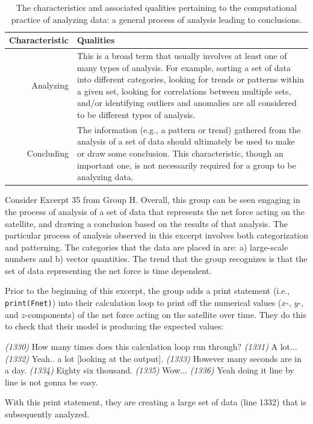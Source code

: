 \documentclass{msuphddissertation}
\begin{document}
\begin{doublespace}
\begin{table}
\begin{tabular}{r|p{}}
Characteristic & Qualities \\\hline\hline
Analyzing & This is a broad term that usually involves at least one of many types of analysis.  For example, sorting a set of data into different categories, looking for trends or patterns within a given set, looking for correlations between multiple sets, and/or identifying outliers and anomalies are all considered to be different types of analysis.\\
Concluding & The information (e.g., a pattern or trend) gathered from the analysis of a set of data should ultimately be used to make or draw some conclusion.  This characteristic, though an important one, is not necessarily required for a group to be analyzing data.\\
\end{tabular}\caption{The characteristics and associated qualities pertaining to the computational practice of analyzing data: a general process of analysis leading to conclusions.}\label{CH5:AnalyzingData}
\end{table}

Consider Excerpt 35 from Group H.  Overall, this group can be seen engaging in the process of analysis of a set of data that represents the net force acting on the satellite, and drawing a conclusion based on the results of that analysis.  The particular process of analysis observed in this excerpt involves both categorization and patterning.  The categories that the data are placed in are: a) large-scale numbers and b) vector quantities.  The trend that the group recognizes is that the set of data representing the net force is time dependent.

Prior to the beginning of this excerpt, the group adds a print statement (i.e., \texttt{print(Fnet)}) into their calculation loop to print off the numerical values ($x$-, $y$-, and $z$-components) of the net force acting on the satellite over time.  They do this to check that their model is producing the expected values:  \begin{description}
\SD \textit{(1330)} How many times does this {calculation loop} run through?
\SB \textit{(1331)} A lot...		
\SD \textit{(1332)} Yeah.. a lot [looking at the output].
\SB \textit{(1333)} However many seconds are in a day.
\SA \textit{(1334)} Eighty six thousand.
\SD \textit{(1335)} Wow...
\SB \textit{(1336)} Yeah doing it line by line is not gonna be easy.
\end{description}  With this print statement, they are creating a large set of data (line 1332) that is subsequently analyzed.


\end{doublespace}
\end{document}
